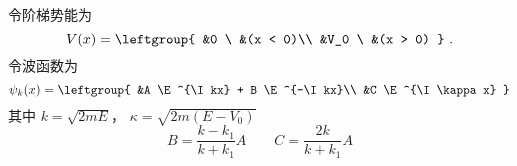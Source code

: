 
\begin{issues}
\issueDraft
\end{issues}

令阶梯势能为
\begin{equation}
V(x) = \leftgroup{
&0 \  &(x < 0)\\
&V_0 \  &(x > 0)
}~.\end{equation}
令波函数为
\begin{equation}
\psi_k(x) = \leftgroup{
&A \E^{\I kx} + B \E^{-\I kx}\\
&C \E^{\I \kappa x}
}\end{equation}
其中 $k = \sqrt{2mE}$， $\kappa = \sqrt{2m(E-V_0)}$
\begin{equation}
B = \frac{k - k_1}{k + k_1}A
\qquad
C = \frac{2k}{k + k_1} A
\end{equation}


